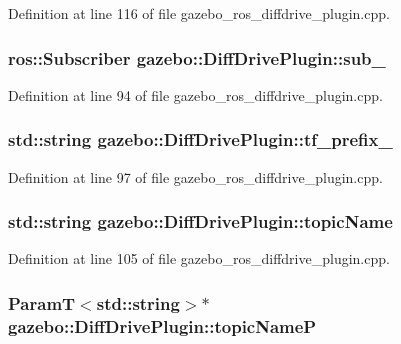 Definition at line 116 of file gazebo\_\-ros\_\-diffdrive\_\-plugin.cpp.

\subsubsection[{sub\_\-}]{\setlength{\rightskip}{0pt plus 5cm}ros::Subscriber {\bf gazebo::DiffDrivePlugin::sub\_\-}\hspace{0.3cm}{\ttfamily  [private]}}\label{classgazebo_1_1DiffDrivePlugin_a1733f2eaaf4e30d1bc20a907557abb47}


Definition at line 94 of file gazebo\_\-ros\_\-diffdrive\_\-plugin.cpp.

\subsubsection[{tf\_\-prefix\_\-}]{\setlength{\rightskip}{0pt plus 5cm}std::string {\bf gazebo::DiffDrivePlugin::tf\_\-prefix\_\-}\hspace{0.3cm}{\ttfamily  [private]}}\label{classgazebo_1_1DiffDrivePlugin_ad0a1d144c0fab4422de673b6ea1a52bc}


Definition at line 97 of file gazebo\_\-ros\_\-diffdrive\_\-plugin.cpp.

\subsubsection[{topicName}]{\setlength{\rightskip}{0pt plus 5cm}std::string {\bf gazebo::DiffDrivePlugin::topicName}\hspace{0.3cm}{\ttfamily  [private]}}\label{classgazebo_1_1DiffDrivePlugin_a7a363d7177ff094979ca9c6b801acc9b}


Definition at line 105 of file gazebo\_\-ros\_\-diffdrive\_\-plugin.cpp.

\subsubsection[{topicNameP}]{\setlength{\rightskip}{0pt plus 5cm}ParamT$<$std::string$>$$\ast$ {\bf gazebo::DiffDrivePlugin::topicNameP}\hspace{0.3cm}{\ttfamily  [private]}}\label{classgazebo_1_1DiffDrivePlugin_aa75ec8e40922cc2a572f2344c163cab1}


